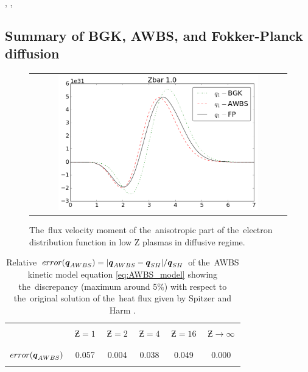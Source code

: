 \documentclass[preprint,12pt]{elsarticle}
\newcommand{\refeq}[1]{\eqref{#1}}
\begin{document}
\cite{Rosenbluth_PR1957}, \cite{Longmire_1963}, \cite{Shkarofsky_1966}

\subsection{Summary of BGK, AWBS, and Fokker-Planck diffusion}
\label{sec:SummaryDiffusiveKinetics}

\begin{figure}[tbh]
  \begin{center}
    \begin{tabular}{c}
      \includegraphics[width=0.8\textwidth]{q1s.png}
    \end{tabular}
  \caption{  
  The~flux velocity moment of the~anisotropic part of the~electron distribution function in low Z plasmas in diffusive regime.}
  \end{center}
  \label{fig:q1s_summary}
\end{figure}

\begin{table}
\begin{center}
  \begin{tabular}{c|ccccc}
    \hline\hline\\
    & $\,\Zbar=1\,$ & $\,\Zbar=2\,$ & $\,\Zbar=4\,$ & $\,\Zbar=16\,$ & $\,\Zbar \rightarrow \infty\,$ \\\\
    \hline\\
    $error(\boldsymbol{q}_{AWBS})$ & 0.057 & 0.004 & 0.038 & 0.049 & 0.000 \\\\
    \hline\hline
  \end{tabular}
  \caption{
  Relative $error(\boldsymbol{q}_{AWBS}) = |\boldsymbol{q}_{AWBS} - \boldsymbol{q}_{SH}| / \boldsymbol{q}_{SH}$ of the~AWBS
  kinetic model equation \refeq{eq:AWBS_model} showing the~discrepancy 
  (maximum around 5$\%$) with respect to the~original solution of 
  the~heat flux given by Spitzer and Harm \cite{SH_PR1953}.
  }
\end{center}
\end{table}
\end{document}
